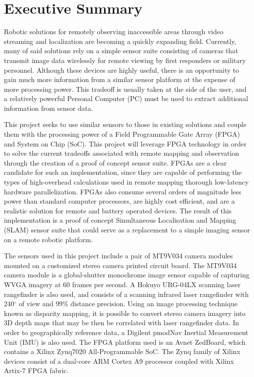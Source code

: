 {}
\section*{Executive Summary}

Robotic solutions for remotely observing inaccessible areas through video streaming and localization are becoming a quickly expanding field. Currently, many of said solutions rely on a simple sensor suite consisting of cameras that transmit image data wirelessly for remote viewing by first responders or military personnel. Although these devices are highly useful, there is an opportunity to gain much more information from a similar sensor platform at the expense of more processing power. This tradeoff is usually taken at the side of the user, and a relatively powerful Personal Computer (PC) must be used to extract additional information from sensor data. 
\par
This project seeks to use similar sensors to those in existing solutions and couple them with the processing power of a Field Programmable Gate Array (FPGA) and System on Chip (SoC). This project will leverage FPGA technology in order to solve the current tradeoffs associated with remote mapping and observation through the creation of a proof of concept sensor suite. FPGAs are a clear candidate for such an implementation, since they are capable of performing the types of high-overhead calculations used in remote mapping thorough low-latency hardware parallelization. FPGAs also consume several orders of magnitude less power than standard computer processors, are highly cost efficient, and are a realistic solution for remote and battery operated devices.  The result of this implementation is a proof of concept Simultaneous Localisation and Mapping (SLAM) sensor suite that could serve as a replacement to a simple imaging sensor on a remote robotic platform. 
\par
The sensors used in this project include a pair of MT9V034 camera modules mounted on a customized stereo camera printed circuit board. The MT9V034 camera module is a global-shutter monochrome image sensor capable of capturing WVGA imagery at 60 frames per second. A Hokuyo URG-04LX scanning laser rangefinder is also used, and consists of a scanning infrared laser rangefinder with 240$^\circ$ of view and 99\% distance precision. Using an image processing technique known as disparity mapping, it is possible to convert stereo camera imagery into 3D depth maps that may be then be correlated with laser rangefinder data. In order to geographically reference data, a Digilent pmodNav Inertial Measurement Unit (IMU) is also used. The FPGA platform used is an Avnet ZedBoard, which contains a Xilinx Zynq7020 All-Programmable SoC. The Zynq family of Xilinx devices consist of a dual-core ARM Cortex A9 processor coupled with Xilinx Artix-7 FPGA fabric.
